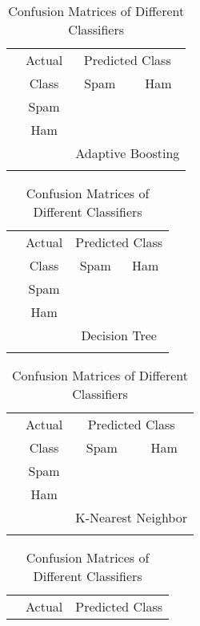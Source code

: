 \documentclass[11pt]{article}
\begin{document}
\begin{table}
\begin{center}
\caption{Confusion Matrices of Different Classifiers}\label{table2}
\vspace{0.4cm}
\begin{tabular}{c|ccc}
\cline{2-4} &Actual	&\multicolumn{2}{|c|}{Predicted Class}  \\
\cline{3-4} 		&Class		&\multicolumn{1}{|c}{Spam}	&\multicolumn{1}{c|}{Ham}  \\
\cline{2-4} 	&Spam	&\multicolumn{1}{|c}{ }	&\multicolumn{1}{c|}{ }	\\
&Ham	&\multicolumn{1}{|c}{ }	&\multicolumn{1}{c|}{ }	\\
\cline{2-4} \multicolumn{1}{c}{}  &\multicolumn{1}{c}{ } &\multicolumn{2}{c}{Adaptive Boosting}    \\
\multicolumn{4}{c}{}
\end{tabular}
\begin{tabular}{c|ccc}
\cline{2-4} &Actual	&\multicolumn{2}{|c|}{Predicted Class}  \\
\cline{3-4} 		&Class		&\multicolumn{1}{|c}{Spam}	&\multicolumn{1}{c|}{Ham}  \\
\cline{2-4} 	&Spam	&\multicolumn{1}{|c}{ }	&\multicolumn{1}{c|}{ }	\\
&Ham	&\multicolumn{1}{|c}{ }	&\multicolumn{1}{c|}{ }	\\
\cline{2-4} \multicolumn{1}{c}{}  &\multicolumn{1}{c}{ } &\multicolumn{2}{c}{Decision Tree}    \\
\multicolumn{4}{c}{}
\end{tabular}
\begin{tabular}{c|ccc}
\cline{2-4} &Actual	&\multicolumn{2}{|c|}{Predicted Class}  \\
\cline{3-4} 		&Class		&\multicolumn{1}{|c}{Spam}	&\multicolumn{1}{c|}{Ham}  \\
\cline{2-4} 	&Spam	&\multicolumn{1}{|c}{ }	&\multicolumn{1}{c|}{ }	\\
&Ham	&\multicolumn{1}{|c}{ }	&\multicolumn{1}{c|}{ }	\\
\cline{2-4} \multicolumn{1}{c}{}  &\multicolumn{1}{c}{ } &\multicolumn{2}{c}{K-Nearest Neighbor}    \\
\multicolumn{4}{c}{}
\end{tabular}
\begin{tabular}{c|ccc}
\cline{2-4} &Actual	&\multicolumn{2}{|c|}{Predicted Class}  \\

\end{tabular}
\end{center}
\end{table}
\end{document}
